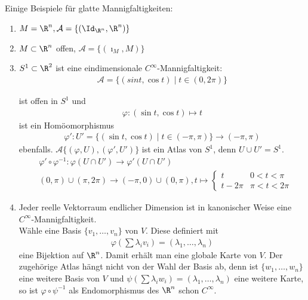 \begin{bsp}
  Einige Beispiele für glatte Mannigfaltigkeiten:
  \begin{enumerate}
  \item $M = \R^n, \mathcal A = \{(\Id_{\R^n},\R^n)\}$
  \item $M \subset \R^n$ offen, $\mathcal A = \{(\imath_{M},M)\}$
  \item $S^1 \subset \R^2$ ist eine eindimensionale $C^{\infty}$-Mannigfaltigkeit:
    \begin{align*}
      \mathcal A = \{(sin t, \cos t) \mid t \in (0,2\pi)\}
    \end{align*}


    ist offen in $S^1$ und
    \begin{align*}
      \varphi \colon (\sin t, \cos t) \mapsto t
    \end{align*}
    ist ein Homöomorphismus
    \begin{align*}
      \varphi' \colon U' = \{(\sin t, \cos t) \mid t \in (-\pi,\pi)\} \to (-\pi,\pi)
    \end{align*}
    ebenfalls. $\mathcal A  \{(\varphi, U), (\varphi',U')\}$ ist ein Atlas von $S^1$, denn $U \cup U' = S^1$.
    \begin{align*}
      & \varphi' \circ \varphi^{-1} \colon \varphi(U \cap U') \to \varphi'(U \cap U')\\
      & (0,\pi)\cup(\pi,2\pi) \to (-\pi,0)\cup(0,\pi), t \mapsto \begin{cases}
        t & 0 < t < \pi\\
        t-2\pi & \pi < t < 2\pi
      \end{cases}
    \end{align*}

  \item Jeder reelle Vektorraum endlicher Dimension ist in kanonischer Weise eine $C^{\infty}$-Mannigfaltigkeit.\\
    Wähle eine Basis $\{v_1, \ldots, v_n\}$ von $V$. Diese definiert mit
    \begin{align*}
      \varphi\left(\sum\lambda_iv_i\right) = (\lambda_1, \ldots, \lambda_n)
    \end{align*}
    eine Bijektion auf $\R^n$. Damit erhält man eine globale Karte von $V$.
    Der zugehörige Atlas hängt nicht von der Wahl der Basis ab, denn ist $\{w_1, \ldots, w_n\}$ eine weitere Basis von $V$ und $\psi(\sum \lambda_iw_i) = (\lambda_1, \ldots, \lambda_n)$ eine weitere Karte, so ist $\varphi \circ \psi^{-1}$ als Endomorphismus des $\R^n$ schon $C^{\infty}$.


\end{enumerate}
\end{bsp}
